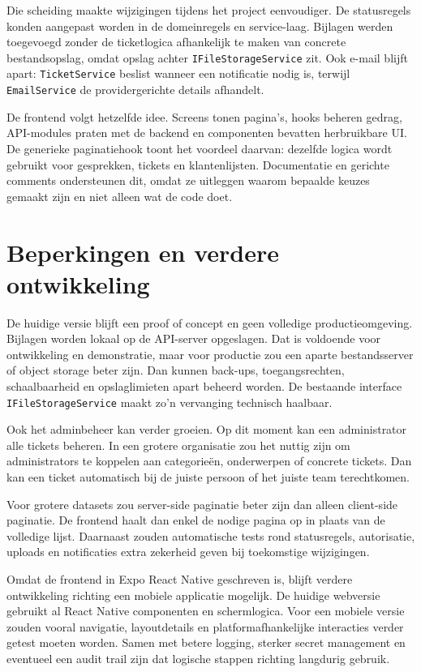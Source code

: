 Die scheiding maakte wijzigingen tijdens het project eenvoudiger. De statusregels konden aangepast worden in de domeinregels en service-laag. Bijlagen werden toegevoegd zonder de ticketlogica afhankelijk te maken van concrete bestandsopslag, omdat opslag achter \texttt{IFileStorageService} zit. Ook e-mail blijft apart: \texttt{TicketService} beslist wanneer een notificatie nodig is, terwijl \texttt{EmailService} de providergerichte details afhandelt.

De frontend volgt hetzelfde idee. Screens tonen pagina's, hooks beheren gedrag, API-modules praten met de backend en componenten bevatten herbruikbare UI. De generieke paginatiehook toont het voordeel daarvan: dezelfde logica wordt gebruikt voor gesprekken, tickets en klantenlijsten. Documentatie en gerichte comments ondersteunen dit, omdat ze uitleggen waarom bepaalde keuzes gemaakt zijn en niet alleen wat de code doet.

\section{Beperkingen en verdere ontwikkeling}

De huidige versie blijft een proof of concept en geen volledige productieomgeving. Bijlagen worden lokaal op de API-server opgeslagen. Dat is voldoende voor ontwikkeling en demonstratie, maar voor productie zou een aparte bestandsserver of object storage beter zijn. Dan kunnen back-ups, toegangsrechten, schaalbaarheid en opslaglimieten apart beheerd worden. De bestaande interface \texttt{IFileStorageService} maakt zo'n vervanging technisch haalbaar.

Ook het adminbeheer kan verder groeien. Op dit moment kan een administrator alle tickets beheren. In een grotere organisatie zou het nuttig zijn om administrators te koppelen aan categorieën, onderwerpen of concrete tickets. Dan kan een ticket automatisch bij de juiste persoon of het juiste team terechtkomen.

Voor grotere datasets zou server-side paginatie beter zijn dan alleen client-side paginatie. De frontend haalt dan enkel de nodige pagina op in plaats van de volledige lijst. Daarnaast zouden automatische tests rond statusregels, autorisatie, uploads en notificaties extra zekerheid geven bij toekomstige wijzigingen.

Omdat de frontend in Expo React Native geschreven is, blijft verdere ontwikkeling richting een mobiele applicatie mogelijk. De huidige webversie gebruikt al React Native componenten en schermlogica. Voor een mobiele versie zouden vooral navigatie, layoutdetails en platformafhankelijke interacties verder getest moeten worden. Samen met betere logging, sterker secret management en eventueel een audit trail zijn dat logische stappen richting langdurig gebruik.
